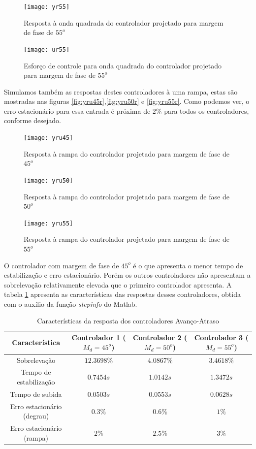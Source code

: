 \documentclass{article}
\begin{document}
\begin{figure}[H]
	\centering
	\texttt{[image: yr55]}
	\caption{Resposta à onda quadrada do controlador projetado para margem de fase de $55^o$}
	\label{fig:yr55}
\end{figure}
\begin{figure}[H]
	\centering
	\texttt{[image: ur55]}
	\caption{Esforço de controle para onda quadrada do controlador projetado para margem de fase de $55^o$}
	\label{fig:ur55}
\end{figure}

Simulamos também as respostas destes controladores à uma rampa, estas são mostradas nas figuras \ref{fig:yru45r},\ref{fig:yru50r} e \ref{fig:yru55r}. Como podemos ver, o erro estacionário para essa entrada é próxima de $2\%$ para todos os controladores, conforme desejado.
\begin{figure}[H]
	\centering
	\texttt{[image: yru45]}
	\caption{Resposta à rampa do controlador projetado para margem de fase de $45^o$}
	\label{fig:yur45}
\end{figure}
\begin{figure}[H]
	\centering
	\texttt{[image: yru50]}
	\caption{Resposta à rampa do controlador projetado para margem de fase de $50^o$}
	\label{fig:yur50}
\end{figure}
\begin{figure}[H]
	\centering
	\texttt{[image: yru55]}
	\caption{Resposta à rampa do controlador projetado para margem de fase de $55^o$}
	\label{fig:yur55}
\end{figure}

O controlador com margem de fase de $45^o$ é o que apresenta o menor tempo de estabilização e erro estacionário. Porém os outros controladores não apresentam a sobrelevação relativamente elevada que o primeiro controlador apresenta. A tabela \ref{tab:avat} apresenta as características das respostas desses controladores, obtida com o auxílio da função \textit{stepinfo} do Matlab.
\begin{table}[H]
	\centering
	\caption{Características da resposta dos controladores Avanço-Atraso}
	\label{tab:avat}
	\begin{tabular}{|c|c|c|c|}
		\hline Característica & Controlador 1 ($M_d = 45^o$)& Controlador 2 ($M_d = 50^o$)& Controlador 3 ($M_d = 55^o$)\\ 
		\hline Sobrelevação & $12.3698\%$ & $4.0867\%$ & $3.4618\%$\\ 
		\hline Tempo de estabilização & $0.7454s$ & $1.0142s$ & $1.3472s$\\ 
		\hline Tempo de subida & $0.0503s$ & $0.0553s$ & $0.0628s$\\ 
		\hline Erro estacionário (degrau) & $0.3\%$ & $0.6\%$ & $1\%$\\ 
		\hline Erro estacionário (rampa) & $2\%$ & $2.5\%$ & $3\%$\\ 
		\hline 
	\end{tabular} 
\end{table}
\end{document}
